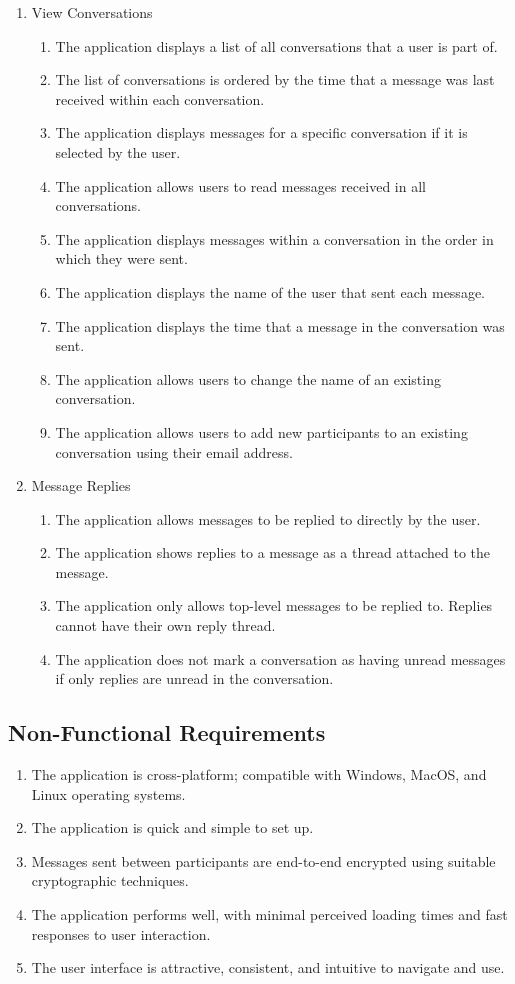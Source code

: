 \begin{enumerate}
  \item View Conversations
  \begin{enumerate}
    \item The application displays a list of all conversations that a user is part of.
    \item The list of conversations is ordered by the time that a message was last received within each conversation.
    \item The application displays messages for a specific conversation if it is selected by the user.
    \item The application allows users to read messages received in all conversations.
    \item The application displays messages within a conversation in the order in which they were sent.
    \item The application displays the name of the user that sent each message.
    \item The application displays the time that a message in the conversation was sent.
    \item The application allows users to change the name of an existing conversation.
    \item The application allows users to add new participants to an existing conversation using their email address.
  \end{enumerate}

  \item Message Replies
  \begin{enumerate}
    \item The application allows messages to be replied to directly by the user.
    \item The application shows replies to a message as a thread attached to the message.
    \item The application only allows top-level messages to be replied to. Replies cannot have their own reply thread.
    \item The application does not mark a conversation as having unread messages if only replies are unread in the conversation.
  \end{enumerate}
\end{enumerate}

\subsection{Non-Functional Requirements}
\begin{enumerate}
  \item The application is cross-platform; compatible with Windows, MacOS, and Linux operating systems.
  \item The application is quick and simple to set up.
  \item Messages sent between participants are end-to-end encrypted using suitable cryptographic techniques.
  \item The application performs well, with minimal perceived loading times and fast responses to user interaction.
  \item The user interface is attractive, consistent, and intuitive to navigate and use.
\end{enumerate}

